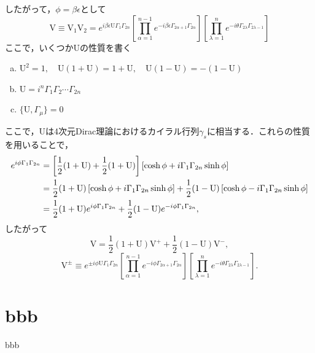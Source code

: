\documentclass[a4paper,11pt]{jsreport}
\begin{document}
したがって，$\phi = \beta \epsilon$として
\begin{equation}
  \mathrm{V} \equiv \mathrm{V}_1 \mathrm{V}_2
  = e^{i \beta \epsilon \mathrm{U} \Gamma_1 \Gamma_{2n}}\left[ \prod_{\alpha=1}^{n-1} e^{-i \beta \epsilon \Gamma_{2\alpha+1} \Gamma_{2\alpha}} \right] \left[ \prod_{\lambda=1}^{n} e^{-i \theta \Gamma_{2\lambda} \Gamma_{2\lambda-1}} \right]
\end{equation}
ここで，いくつか$\mathrm{U}$の性質を書く
\begin{enumerate}[(a)]
  \item $\mathrm{U}^2 = 1, \quad \mathrm{U}(1 + \mathrm{U}) = 1 + \mathrm{U}, \quad \mathrm{U}(1 - \mathrm{U}) = -(1 - \mathrm{U})$
  \item $\mathrm{U} = i^n \Gamma_1 \Gamma_2 \cdots \Gamma_{2n}$
  \item $\{\mathrm{U}, \Gamma_{\mu}\} = 0$
\end{enumerate}
ここで，$\mathrm{U}$は4次元Dirac理論におけるカイラル行列$\gamma_s$に相当する．これらの性質を用いることで，
\begin{align}
  e^{i \phi \Gamma_1 \Gamma_{2n}}
  &= \left[\frac{1}{2} (1 + \mathrm{U}) + \frac{1}{2} (1 + \mathrm{U})\right]\left[\cosh{\phi} + i \Gamma_1 \Gamma_{2n} \sinh{\phi}\right]
  \notag \\
  &= \frac{1}{2} (1 + \mathrm{U})\left[\cosh{\phi} + i \Gamma_1 \Gamma_{2n} \sinh{\phi}\right]
  + \frac{1}{2} (1 - \mathrm{U})\left[\cosh{\phi} - i \Gamma_1 \Gamma_{2n} \sinh{\phi}\right] \notag \\
  &= \frac{1}{2} (1 + \mathrm{U}) e^{i \phi \Gamma_1 \Gamma_{2n}}
  + \frac{1}{2} (1 - \mathrm{U}) e^{-i \phi \Gamma_1 \Gamma_{2n}},
\end{align}
したがって
\begin{equation}
  \mathrm{V} 
  = \frac{1}{2} (1 + \mathrm{U}) \mathrm{V}^+
  + \frac{1}{2} (1 - \mathrm{U}) \mathrm{V}^-,
\end{equation}
\begin{equation}
  \mathrm{V}^{\pm}
  \equiv e^{\pm i \phi \mathrm{U} \Gamma_1 \Gamma_{2n}}\left[ \prod_{\alpha=1}^{n-1} e^{-i \phi \Gamma_{2\alpha+1} \Gamma_{2\alpha}} \right] \left[ \prod_{\lambda=1}^{n} e^{-i \theta \Gamma_{2\lambda} \Gamma_{2\lambda-1}} \right].
\end{equation}


\section{bbb}
bbb
\end{document}
